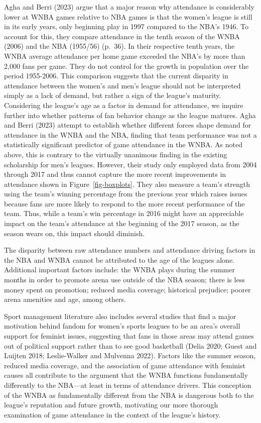\documentclass[
  letterpaper,
  DIV=11,
  numbers=noendperiod]{scrartcl}
\begin{document}
Agha and Berri (2023) argue that a major reason why attendance is
considerably lower at WNBA games relative to NBA games is that the
women's league is still in its early years, only beginning play in 1997
compared to the NBA's 1946. To account for this, they compare attendance
in the tenth season of the WNBA (2006) and the NBA (1955/56) (p.~36). In
their respective tenth years, the WNBA average attendance per home game
exceeded the NBA's by more than 2,000 fans per game. They do not control
for the growth in population over the period 1955-2006. This comparison
suggests that the current disparity in attendance between the women's
and men's league should not be interpreted simply as a lack of demand,
but rather a sign of the league's maturity. Considering the league's age
as a factor in demand for attendance, we inquire further into whether
patterns of fan behavior change as the league matures. Agha and Berri
(2023) attempt to establish whether different forces shape demand for
attendance in the WNBA and the NBA, finding that team performance was
not a statistically significant predictor of game attendance in the
WNBA. As noted above, this is contrary to the virtually unanimous
finding in the existing scholarship for men's leagues. However, their
study only employed data from 2004 through 2017 and thus cannot capture
the more recent improvements in attendance shown in
Figure~\ref{fig-boxplots}. They also measure a team's strength using the
team's winning percentage from the previous year which raises issues
because fans are more likely to respond to the more recent performance
of the team. Thus, while a team's win percentage in 2016 might have an
appreciable impact on the team's attendance at the beginning of the 2017
season, as the season wears on, this impact should diminish.

The disparity between raw attendance numbers and attendance driving
factors in the NBA and WNBA cannot be attributed to the age of the
leagues alone. Additional important factors include: the WNBA plays
during the summer months in order to promote arena use outside of the
NBA season; there is less money spent on promotion; reduced media
coverage; historical prejudice; poorer arena amenities and age, among
others.

Sport management literature also includes several studies that find a
major motivation behind fandom for women's sports leagues to be an
area's overall support for feminist issues, suggesting that fans in
those areas may attend games out of political support rather than to see
good basketball (Delia 2020; Guest and Luijten 2018; Leslie-Walker and
Mulvenna 2022). Factors like the summer season, reduced media coverage,
and the association of game attendance with feminist causes all
contribute to the argument that the WNBA functions fundamentally
differently to the NBA---at least in terms of attendance drivers. This
conception of the WNBA as fundamentally different from the NBA is
dangerous both to the league's reputation and future growth, motivating
our more thorough examination of game attendance in the context of the
league's history.
\end{document}
